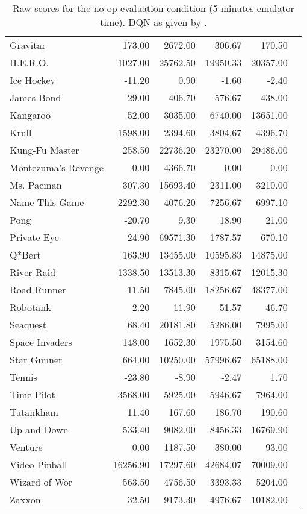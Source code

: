 \documentclass[letterpaper]{article}
\begin{document}
\begin{table*}[h]
\begin{tabular}{lrrrrr}
Gravitar & 173.00 & 2672.00 & 306.67 & 170.50 \\
H.E.R.O. & 1027.00 & 25762.50 & 19950.33 & 20357.00 \\
Ice Hockey & -11.20 & 0.90 & -1.60 & -2.40 \\
James Bond & 29.00 & 406.70 & 576.67 & 438.00 \\
Kangaroo & 52.00 & 3035.00 & 6740.00 & 13651.00 \\
Krull & 1598.00 & 2394.60 & 3804.67 & 4396.70 \\
Kung-Fu Master & 258.50 & 22736.20 & 23270.00 & 29486.00 \\
Montezuma's Revenge & 0.00 & 4366.70 & 0.00 & 0.00 \\
Ms. Pacman & 307.30 & 15693.40 & 2311.00 & 3210.00 \\
Name This Game & 2292.30 & 4076.20 & 7256.67 & 6997.10 \\
Pong & -20.70 & 9.30 & 18.90 & 21.00 \\
Private Eye & 24.90 & 69571.30 & 1787.57 & 670.10 \\
Q*Bert & 163.90 & 13455.00 & 10595.83 & 14875.00 \\
River Raid & 1338.50 & 13513.30 & 8315.67 & 12015.30 \\
Road Runner & 11.50 & 7845.00 & 18256.67 & 48377.00 \\
Robotank & 2.20 & 11.90 & 51.57 & 46.70 \\
Seaquest & 68.40 & 20181.80 & 5286.00 & 7995.00 \\
Space Invaders & 148.00 & 1652.30 & 1975.50 & 3154.60 \\
Star Gunner & 664.00 & 10250.00 & 57996.67 & 65188.00 \\
Tennis & -23.80 & -8.90 & -2.47 & 1.70 \\
Time Pilot & 3568.00 & 5925.00 & 5946.67 & 7964.00 \\
Tutankham & 11.40 & 167.60 & 186.70 & 190.60 \\
Up and Down & 533.40 & 9082.00 & 8456.33 & 16769.90 \\
Venture & 0.00 & 1187.50 & 380.00 & 93.00 \\
Video Pinball & 16256.90 & 17297.60 & 42684.07 & 70009.00 \\
Wizard of Wor & 563.50 & 4756.50 & 3393.33 & 5204.00 \\
Zaxxon & 32.50 & 9173.30 & 4976.67 & 10182.00 \\
\end{tabular}
\caption{Raw scores for the no-op evaluation condition (5 minutes emulator time). DQN as given by \citet{Mnih:2015}.}
\end{table*}
\end{document}
